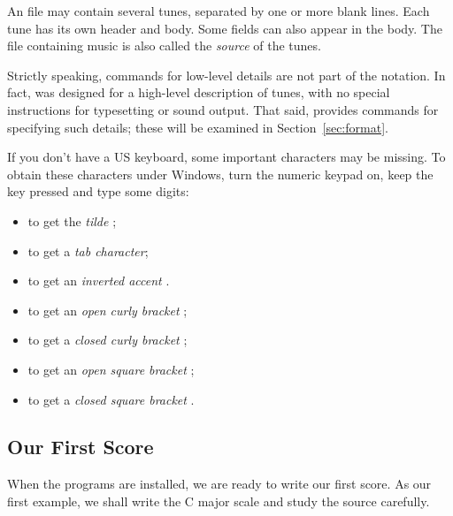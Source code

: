 \documentclass[a4paper,12pt]{book}
\begin{document}
An \ABC{} file may contain several tunes, separated by one or more
blank lines. Each tune has its own header and body. Some fields can
also appear in the body. The file containing \ABC{} music is also
called the \emph{source} of the tunes.

Strictly speaking, commands for low-level details are not part of the
notation. In fact, \ABC{} was designed for a high-level description of
tunes, with no special instructions for typesetting or sound output.
That said, \ABCPLUS{} provides commands for specifying such details;
these will be examined in Section~\ref{sec:format}.

If you don't have a US keyboard, some important characters may be
missing. To obtain these characters under Windows, turn the numeric
keypad on, keep the  key pressed and type some digits:

\begin{itemize}
  
  \item {} to get the \emph{tilde} \car{\textasciitilde};
  
  \item {} to get a \emph{tab character};
  
  \item {} to get an \emph{inverted accent} .
  
  \item {} to get an \emph{open curly bracket} \car{\{};
  
  \item {} to get a \emph{closed curly bracket} \car{\}};
  
  \item {} to get an \emph{open square bracket} \car{[};
  
  \item {} to get a \emph{closed square bracket} \car{]}.
  
\end{itemize}


\subsection{Our First Score}
\label{sec:first}

When the programs are installed, we are ready to write our first
score. As our first example, we shall write the C major scale and
study the source carefully.
\end{document}
